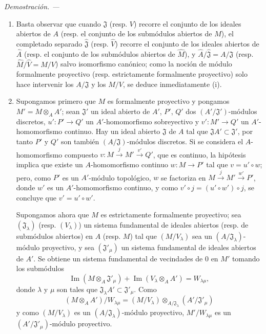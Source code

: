 \documentclass[10pt,oneside]{book}
\newenvironment{proof}{%
  \par\medskip\noindent\textit{Demostración. ---\ }}{\par}
\begin{document}
\begin{proof}
\begin{enumerate}
  \item[(i)] Basta observar que cuando $\mathfrak J$ (resp. $V$)
  recorre el conjunto de los ideales abiertos de $A$ (resp. el conjunto de los
  submódulos abiertos de $M$), el completado separado $\hat{\mathfrak J}$
  (resp. $\hat V$) recorre el conjunto de los ideales abiertos de $\hat A$
  (resp. el conjunto de los submódulos abiertos de $\hat M$), y
  $\hat A/\hat{\mathfrak J}=A/\mathfrak J$ (resp.
  $\hat M/\hat V=M/V$) salvo isomorfismo canónico; como la noción
  de módulo formalmente proyectivo (resp. estrictamente formalmente proyectivo)
  solo hace intervenir los $A/\mathfrak J$ y los $M/V$, se deduce
  inmediatamente (i).
  \item[(ii)] Supongamos primero que $M$ es formalmente proyectivo y pongamos
  $M'=M\otimes_A A'$; sean $\mathfrak J'$ un ideal abierto de $A'$, $P'$,
  $Q'$ dos $(A'/\mathfrak J')$-módulos discretos, $u':P'\to Q'$ un
  $A'$-homomorfismo sobreyectivo y $v':M'\to Q'$ un $A'$-homomorfismo continuo.
  Hay un ideal abierto $\mathfrak J$ de $A$ tal que
  $\mathfrak JA'\subset\mathfrak J'$, por tanto $P'$ y $Q'$ son también
  $(A/\mathfrak J)$-módulos discretos. Si se considera el
  $A$-homomorfismo compuesto $v:M\xrightarrow{j}M'\xrightarrow{v'}Q'$, que es
  continuo, la hipótesis implica que existe un $A$-homomorfismo continuo
  $w:M\to P'$ tal que $v=u'\circ w$; pero, como $P'$ es un $A'$-módulo
  topológico, $w$ se factoriza en
  $M\xrightarrow{j}M'\xrightarrow{w'}P'$, donde $w'$ es un $A'$-homomorfismo
  continuo, y como $v'\circ j=(u'\circ w')\circ j$, se concluye que
  $v'=u'\circ w'$.

  Supongamos ahora que $M$ es estrictamente formalmente proyectivo; sea
  $(\mathfrak J_\lambda)$ (resp. $(V_\lambda)$) un sistema fundamental
  de ideales abiertos (resp. de submódulos abiertos) en $A$ (resp. $M$) tal
  que $(M/V_\lambda)$ sea un $(A/\mathfrak J_\lambda)$-módulo proyectivo,
  y sea $(\mathfrak J'_\mu)$ un sistema fundamental de ideales abiertos de
  $A'$. Se obtiene un sistema fundamental de vecindades de $0$ en $M'$ tomando
  los submódulos
  \[
    \operatorname{Im}(M\otimes_A\mathfrak J'_\mu)
    +\operatorname{Im}(V_\lambda\otimes_A A')=W_{\lambda\mu},
  \]
  donde $\lambda$ y $\mu$ son tales que
  $\mathfrak J_\lambda A'\subset\mathfrak J'_\mu$. Como
  \[
    (M\otimes_A A')/W_{\lambda\mu}
    =(M/V_\lambda)\otimes_{A/\mathfrak J_\lambda}
      (A'/\mathfrak J'_\mu)
  \]
  y como $(M/V_\lambda)$ es un
  $(A/\mathfrak J_\lambda)$-módulo proyectivo, $M'/W_{\lambda\mu}$
  es un $(A'/\mathfrak J'_\mu)$-módulo proyectivo.
\end{enumerate}
\end{proof}
\end{document}
